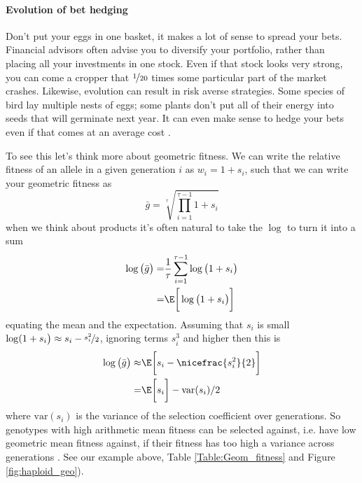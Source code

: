 \paragraph{Evolution of bet hedging}


Don't put your eggs in one basket, it makes a lot of sense to spread
your bets. Financial advisors often advise you to diversify your
portfolio, rather than placing all your investments in one stock. Even
if that stock looks very strong, you can come a cropper that
$\nicefrac{1}{20}$ times some particular part of the market
crashes. Likewise, evolution can result in risk averse
strategies. Some species of bird lay multiple nests of eggs; some
plants don't put all of their energy into seeds that will germinate next year. It can
even make sense to hedge your bets even if that comes at an average
cost \citep{seger1987oxford}.

To see this let's think more about geometric fitness. We can write the
relative fitness of an allele in a given generation $i$ as $w_{i}= 1+s_i$, such that we can
write your geometric fitness as
\begin{equation}
 \bar{g}= \sqrt[\tau]{\prod_{i=1}^{\tau-1} 1+s_i}  \label{hap_geo_fitness_bh}
  \end{equation}
when we think about products it's often natural to take the $\log$ to
turn it into a sum
\begin{align}
 \log \big( \bar{g} \big) =& \frac{1}{\tau} \sum_{i=1}^{\tau-1} \log \big(1+s_i \big) \nonumber\\
  = & \E \bigg[ \log \big( 1+s_i \big) \bigg]
\end{align}
equating the mean and the expectation. Assuming that $s_i$ is small $\log(1+s_i \big) \approx s_i -
\nicefrac{s_i^2}{2}$, ignoring terms $s_i^3$ and
higher then this is
\begin{align}
  \log \big( \bar{g}  \big) \approx & \E\bigg[  s_i -\nicefrac{s_i^2}{2}  \bigg]  \nonumber\\
  =  & \E \bigg[  s_i \bigg]  - \textrm{var}(s_i)/2 \nonumber\\
\end{align}
where $\textrm{var}(s_i)$ is the variance of the selection coefficient
over generations.
So genotypes with high arithmetic mean fitness can be selected against,
i.e. have low geometric mean fitness against, if their fitness has too
high a variance across generations \citep{gillespie1973natural,gillespie1977natural}. See our example
above,  Table \ref{Table:Geom_fitness} and Figure \ref{fig:haploid_geo}).

